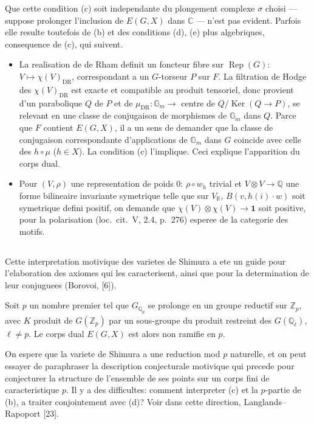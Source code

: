\documentclass[11pt,a4paper]{article}
\theoremstyle{plain}
\theoremstyle{definition}
\DeclareMathOperator{\Ker}{Ker}
\DeclareMathOperator{\Rep}{Rep}
\newcommand{\Q}{\mathbb{Q}}
\newcommand{\Z}{\mathbb{Z}}
\newcommand{\C}{\mathbb{C}}
\newcommand{\R}{\mathbb{R}}
\DeclareMathOperator{\DR}{DR}
\begin{document}
Que cette condition (c) soit independante du plongement complexe $\sigma$ choisi --- suppose prolonger l'inclusion de $E(G, X)$ dans $\C$ --- n'est pas evident. Parfois elle resulte toutefois de (b) et des conditions (d), (e) plus algebriques, consequence de (c), qui suivent.

\begin{itemize}
\item[(d)] La realisation de de Rham definit un foncteur fibre sur $\Rep(G)$: $V \mapsto \chi(V)_{\DR}$, correspondant a un $G$-torseur $P$ sur $F$. La filtration de Hodge des $\chi(V)_{\DR}$ est exacte et compatible au produit tensoriel, donc provient d'un parabolique $Q$ de $P$ et de $\mu_{\DR}: \mathbb{G}_m \to$ centre de $Q/\Ker(Q \to P)$, se relevant en une classe de conjugaison de morphismes de $\mathbb{G}_m$ dans $Q$. Parce que $F$ contient $E(G, X)$, il a un sens de demander que la classe de conjugaison correspondante d'applications de $\mathbb{G}_m$ dans $G$ coincide avec celle des $h \circ \mu$ ($h \in X$). La condition (c) l'implique. Ceci explique l'apparition du corps dual.

\item[(e)] Pour $(V, \rho)$ une representation de poids $0$: $\rho \circ w_h$ trivial et $V \otimes V \to \Q$ une forme bilineaire invariante symetrique telle que sur $V_{\R}$, $B(v, h(i) \cdot w)$ soit symetrique defini positif, on demande que $\chi(V) \otimes \chi(V) \to \mathbf{1}$ soit positive, pour la polarisation (loc.~cit.~V, 2.4, p.~276) esperee de la categorie des motifs.
\end{itemize}

\subsection{}

Cette interpretation motivique des varietes de Shimura a ete un guide pour l'elaboration des axiomes qui les caracterisent, ainsi que pour la determination de leur conjuguees (Borovoi, [6]).

Soit $p$ un nombre premier tel que $G_{\Q_p}$ se prolonge en un groupe reductif sur $\Z_p$, avec $K$ produit de $G(\Z_p)$ par un sous-groupe du produit restreint des $G(\Q_\ell)$, $\ell \neq p$. Le corps dual $E(G, X)$ est alors non ramifie en $p$.

On espere que la variete de Shimura a une reduction mod $p$ naturelle, et on peut essayer de paraphraser la description conjecturale motivique qui precede pour conjecturer la structure de l'ensemble de ses points sur un corps fini de caracteristique $p$. Il y a des difficultes: comment interpreter (c) et la $p$-partie de (b), a traiter conjointement avec (d)? Voir dans cette direction, Langlands--Rapoport [23].
\end{document}
